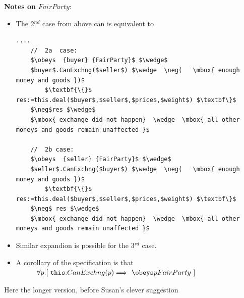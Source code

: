  
  \textbf{Notes on} $FairParty$:\\
 \begin{itemize}
 \item
The 2$^{nd}$ case from above can is equivalent to\\
\begin{lstlisting}[mathescape=true, language=Chainmail, frame=lines]
....   
    //  2a  case:
    $\obeys  {buyer} {FairParty}$ $\wedge$ 
    $buyer$.CanExchng($seller$) $\wedge  \neg(   \mbox{ enough money and goods })$  
        $\textbf{\{}$ res:=this.deal($buyer$,$seller$,$price$,$weight$) $\textbf\}$
    $\neg$res $\wedge$
    $\mbox{ exchange did not happen}  \wedge  \mbox{ all other moneys and goods remain unaffected }$
    
    //  2b case:
    $\obeys  {seller} {FairParty}$ $\wedge$ 
    $seller$.CanExchng($buyer$) $\wedge  \neg(   \mbox{ enough money and goods })$  
        $\textbf{\{}$ res:=this.deal($buyer$,$seller$,$price$,$weight$) $\textbf\}$
    $\neg$ res $\wedge$
    $\mbox{ exchange did not happen}  \wedge  \mbox{ all other moneys and goods remain unaffected }$
\end{lstlisting}

\item
Similar expandion is possible for the 3$^{rd}$ case.
\item
A corollary of the specification is that \\
$\strut \hspace{1cm} \forall p. [\ \texttt{this}.CanExchng(p) \Longrightarrow \ \obeys p {FairParty}\ ]$
 \end{itemize}  
 
 
\newpage

Here the longer version, before Susan's clever suggestion

